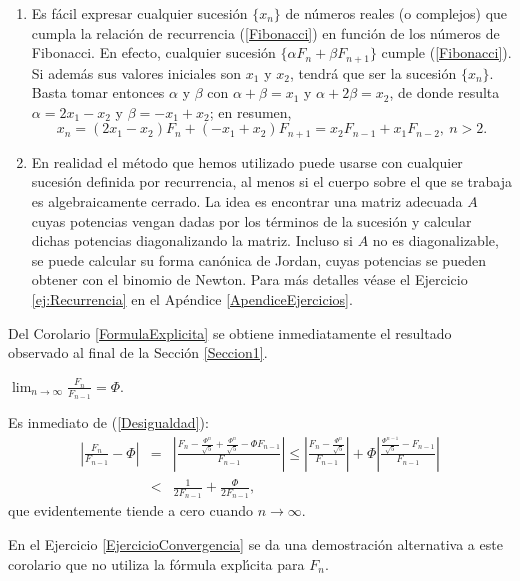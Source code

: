 \begin{observaciones*}
\begin{enumerate}
\item Es f\'acil expresar cualquier sucesi\'on $\{x_n\}$ de n\'umeros reales (o complejos) que cumpla la relaci\'on de recurrencia (\ref{Fibonacci}) en funci\'on de los n\'umeros de Fibonacci. En efecto, cualquier sucesi\'on $\{\alpha F_n+\beta F_{n+1}\}$ cumple (\ref{Fibonacci}). Si adem\'as sus valores iniciales son $x_1$ y $x_2$, tendr\'a que ser la sucesi\'on $\{x_n\}$. Basta tomar entonces $\alpha$ y $\beta$ con $\alpha+\beta=x_1$ y $\alpha+2\beta=x_2$, de donde resulta $\alpha=2x_1-x_2$ y $\beta=-x_1+x_2$; en resumen,
$$x_n=(2x_1-x_2)F_n+(-x_1+x_2)F_{n+1}=x_2F_{n-1}+x_1F_{n-2},\ n>2.$$

\item En realidad el m\'etodo que hemos utilizado puede usarse con cualquier sucesi\'on definida por recurrencia, al menos si el cuerpo sobre el que se trabaja es algebraicamente cerrado. La idea es encontrar una matriz adecuada $A$ cuyas potencias vengan dadas por los t\'erminos de la sucesi\'on y  calcular dichas potencias diagonalizando la matriz. Incluso si $A$ no es diagonalizable, se puede calcular su forma can\'onica de Jordan, cuyas potencias se pueden obtener con el binomio de Newton. Para m\'as detalles v\'ease el Ejercicio \ref{ej:Recurrencia} en el Ap\'endice \ref{ApendiceEjercicios}.
\end{enumerate}
\end{observaciones*}

Del Corolario \ref{FormulaExplicita} se obtiene inmediatamente el resultado observado al final de la Secci\'on \ref{Seccion1}.

\begin{corolario} $\displaystyle\lim_{n\to\infty}\frac{F_n}{F_{n-1}}=\Phi$.
\end{corolario}

\begin{demostracion}
Es inmediato de (\ref{Desigualdad}):
\begin{eqnarray*}\left|\frac{F_n}{F_{n-1}}-\Phi\right|&=&\left|\frac{F_n-\frac{\Phi^n}{\sqrt 5}+\frac{\Phi^n}{\sqrt 5}-\Phi F_{n-1}}{F_{n-1}}\right|\leq
\left| \frac{ F_n-\frac{\Phi^n}{\sqrt 5} }{F_{n-1}}\right|
+\Phi \left| \frac{ \frac{\Phi^{n-1}}{\sqrt 5}-F_{n-1}}{F_{n-1}}\right|\\
&<&\frac{1}{2 F_{n-1}}+\frac{\Phi}{2 F_{n-1}},\end{eqnarray*}
que evidentemente tiende a cero cuando $n\to\infty$.
\end{demostracion}

En el Ejercicio \ref{EjercicioConvergencia} se da una demostraci\'on alternativa a este corolario que no utiliza la f\'ormula expl\'\i cita para $F_n$.
